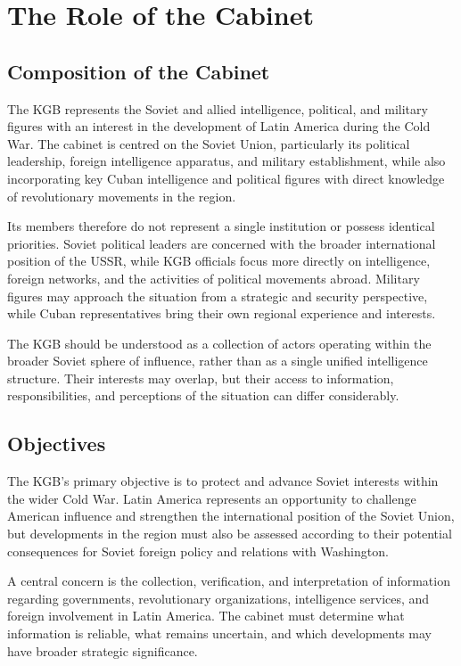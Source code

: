 \section{The Role of the Cabinet}

\subsection{Composition of the Cabinet}

The KGB represents the Soviet and allied intelligence, political, and military figures with an interest in the development of Latin America during the Cold War. The cabinet is centred on the Soviet Union, particularly its political leadership, foreign intelligence apparatus, and military establishment, while also incorporating key Cuban intelligence and political figures with direct knowledge of revolutionary movements in the region.

Its members therefore do not represent a single institution or possess identical priorities. Soviet political leaders are concerned with the broader international position of the USSR, while KGB officials focus more directly on intelligence, foreign networks, and the activities of political movements abroad. Military figures may approach the situation from a strategic and security perspective, while Cuban representatives bring their own regional experience and interests.

The KGB should be understood as a collection of actors operating within the broader Soviet sphere of influence, rather than as a single unified intelligence structure. Their interests may overlap, but their access to information, responsibilities, and perceptions of the situation can differ considerably.

\subsection{Objectives}

The KGB’s primary objective is to protect and advance Soviet interests within the wider Cold War. Latin America represents an opportunity to challenge American influence and strengthen the international position of the Soviet Union, but developments in the region must also be assessed according to their potential consequences for Soviet foreign policy and relations with Washington.

A central concern is the collection, verification, and interpretation of information regarding governments, revolutionary organizations, intelligence services, and foreign involvement in Latin America. The cabinet must determine what information is reliable, what remains uncertain, and which developments may have broader strategic significance.

